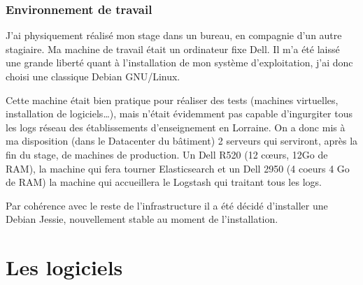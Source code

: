 \documentclass[a4paper,12pt,one side,titlepage]{report}
\begin{document}
\section{Environnement de travail}
J'ai physiquement réalisé mon stage dans un bureau, en compagnie d'un autre stagiaire.
Ma machine de travail était un ordinateur fixe Dell. Il m'a été laissé une grande 
liberté quant à l'installation de mon système d'exploitation, j'ai donc choisi une 
classique Debian GNU/Linux.

Cette machine était bien pratique pour réaliser des tests (machines virtuelles, 
installation de logiciels\ldots), mais n'était évidemment pas capable d'ingurgiter 
tous les logs réseau des établissements d'enseignement en Lorraine. On a donc mis 
à ma disposition (dans le Datacenter du bâtiment) 2 serveurs qui serviront, après 
la fin du stage, de machines de production. Un Dell R520 (12 cœurs, 12Go de RAM),
la machine qui fera tourner Elasticsearch et un Dell 2950 (4 coeurs 4 Go de RAM)
la machine qui accueillera le Logstash qui traitant tous les logs.

Par cohérence avec le reste de l'infrastructure il a été décidé d'installer une 
Debian Jessie, nouvellement stable au moment de l'installation.
%
%
%
%

\part{Les logiciels}
\end{document}
